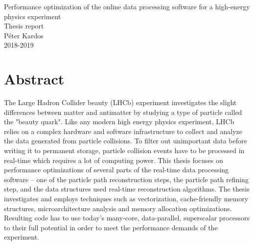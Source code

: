 \documentclass[12pt]{article}
\begin{document}
\begin{center}
	\Huge Performance optimization of the online data processing software for a high-energy physics experiment\\
	\Large Thesis report\\
	\vspace{1pc}
	\huge Péter Kardos \\
	\large 2018-2019
\end{center}


\section*{Abstract}

The Large Hadron Collider beauty (LHCb) experiment\cite{lchb_desc} investigates the slight differences between matter and antimatter by studying a type of particle called the "beauty quark". Like any modern high energy physics experiment, LHCb relies on a complex hardware and software infrastructure to collect and analyze the data generated from particle collisions. To filter out unimportant data before writing it to permanent storage, particle collision events have to be processed in real-time which requires a lot of computing power. 
This thesis focuses on performance optimizations of several parts of the real-time data processing software -- one of the particle path reconstruction steps, the particle path refining step, and the data structures used real-time reconstruction algorithms. The thesis investigates and employs techniques such as vectorization, cache-friendly memory structures, microarchitecture analysis and memory allocation optimizations. Resulting code has to use today's many-core, data-parallel, superscalar processors to their full potential in order to meet the performance demands of the experiment.



\newpage
{
	\small
	\hypersetup{linkcolor=black}
	\tableofcontents
}

\newpage
\end{document}
